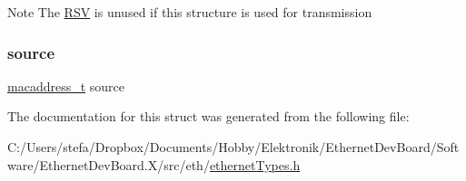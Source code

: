 \begin{DoxyNote}{Note}
The \mbox{\hyperlink{struct_r_s_v}{R\+SV}} is unused if this structure is used for transmission 
\end{DoxyNote}
\mbox{\label{structethernet_frame_ac7fb066288966b4472abc9833d8d42a0}} 
\subsubsection{\texorpdfstring{source}{source}}
{\footnotesize\ttfamily \mbox{\hyperlink{group__ethernet_gacb865bcbf50a6c8cef05581bfabff373}{macaddress\+\_\+t}} source}



The documentation for this struct was generated from the following file\+:\begin{DoxyCompactItemize}
\item 
C\+:/\+Users/stefa/\+Dropbox/\+Documents/\+Hobby/\+Elektronik/\+Ethernet\+Dev\+Board/\+Software/\+Ethernet\+Dev\+Board.\+X/src/eth/\mbox{\hyperlink{ethernet_types_8h}{ethernet\+Types.\+h}}\end{DoxyCompactItemize}
